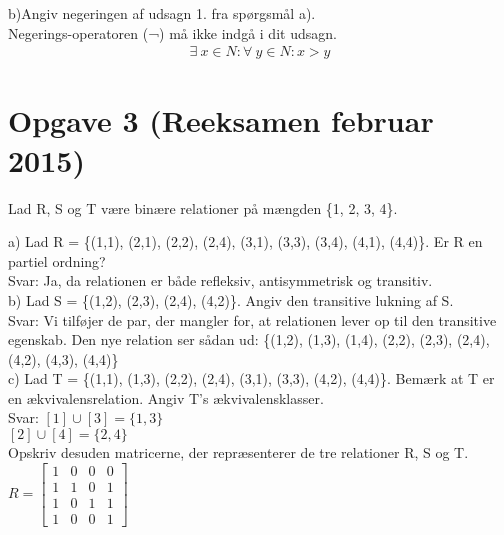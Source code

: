 \documentclass{article}
\begin{document}
b)\;Angiv negeringen af udsagn 1. fra spørgsmål a).\\\newline Negerings-operatoren (¬) må ikke indgå i dit udsagn.
 \begin{align*}
\exists\: x \in N:\forall\:y \in N: x > y
\end{align*}

\section{Opgave 3 (Reeksamen februar 2015)}
Lad R, S og T være binære relationer på mængden \{1, 2, 3, 4\}.

a) Lad R = \{(1,1), (2,1), (2,2), (2,4), (3,1), (3,3), (3,4), (4,1), (4,4)\}. Er R en partiel ordning?
\\
\newline
Svar: Ja, da relationen er både refleksiv, antisymmetrisk og transitiv.
\\
\newline
b) Lad S = \{(1,2), (2,3), (2,4), (4,2)\}. Angiv den transitive lukning af S.
\\
\newline
Svar: Vi tilføjer de par, der mangler for, at relationen lever op til den transitive egenskab. Den nye relation ser sådan ud: \{(1,2), (1,3), (1,4), (2,2), (2,3), (2,4), (4,2), (4,3), (4,4)\}
\\
\newline
c) Lad T = \{(1,1), (1,3), (2,2), (2,4), (3,1), (3,3), (4,2), (4,4)\}. Bemærk at T er en ækvivalensrelation. Angiv T's ækvivalensklasser.
\\
\newline
Svar:
\newline
$ [1] \cup [3] = \{ 1,3 \} $
\\
\newline
$ [2]\cup[4] = \{2,4\} $
\\
\newline
Opskriv desuden matricerne, der repræsenterer de tre relationer R, S og T.
\\
\newline
\begin{math}
R =
\begin{bmatrix}
1 & 0 & 0 & 0\\
1 & 1 & 0 & 1\\
1 & 0 & 1 & 1\\
1 & 0 & 0 & 1
\end{bmatrix}
\end{math}
\\
\end{document}
